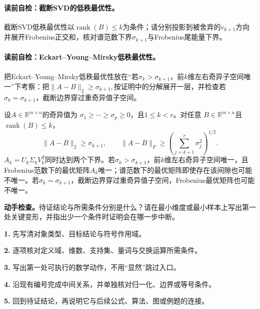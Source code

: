 \paragraph{读前自检：截断SVD的低秩最优性。}截断SVD低秩最优性以$\operatorname{rank}(B)\le k$为条件；请分别投影到被舍弃的$v_{k+1}$方向并展开Frobenius正交和，核对谱范数下界$\sigma_{k+1}$与Frobenius尾能量下界。\par

\paragraph{读前自检：Eckart--Young--Mirsky低秩最优性。}把Eckart--Young--Mirsky低秩最优性放在“若$\sigma_k>\sigma_{k+1}$，前$k$维左右奇异子空间唯一”下考察：把$\|A-B\|_2\geq\sigma_{k+1},$按证明中的分解展开一层，并检查若$\sigma_k=\sigma_{k+1}$，截断边界穿过重奇异值子空间。\par

\begin{theorem}\label{thm:V4-C03-eym}
设$A\in\mathbb R^{m\times n}$的奇异值为
$\sigma_1\geq\cdots\geq\sigma_p\geq0$，且$1\leq k<r$。对任意
$B\in\mathbb R^{m\times n}$且$\operatorname{rank}(B)\leq k$，
\[
\|A-B\|_2\geq\sigma_{k+1},\qquad
\|A-B\|_F\geq\left(\sum_{j=k+1}^{r}\sigma_j^2\right)^{1/2}.
\]
$A_k=U_k\Sigma_kV_k^T$同时达到两个下界。若$\sigma_k>\sigma_{k+1}$，前$k$维左右奇异子空间唯一，且Frobenius范数下的最优矩阵$A_k$唯一；谱范数下的最优矩阵即使存在该间隙也可能不唯一。若$\sigma_k=\sigma_{k+1}$，截断边界穿过重奇异值子空间，Frobenius最优矩阵也可能不唯一。
\end{theorem}

\begin{keypointbox}[title={证明：Eckart--Young--Mirsky低秩最优性：证明阅读检查}]
\textbf{动手检查。}待证结论与所需条件分别是什么？请在最小维度或最小样本上写出第一处关键变形，并指出少一个条件时证明会在哪一步中断。\par
\textbf{1.} 先写清对象类型、目标结论与符号作用域。\par
\textbf{2.} 逐项核对定义域、维数、支持集、量词与交换运算所需条件。\par
\textbf{3.} 写出第一处可执行的数学动作，不用“显然”跳过入口。\par
\textbf{4.} 沿现有编号完成中间关系，并单独核对归一化、边界或等号条件。\par
\textbf{5.} 回到待证结论，再说明它与后续公式、算法、图或例题的连接。
\end{keypointbox}
